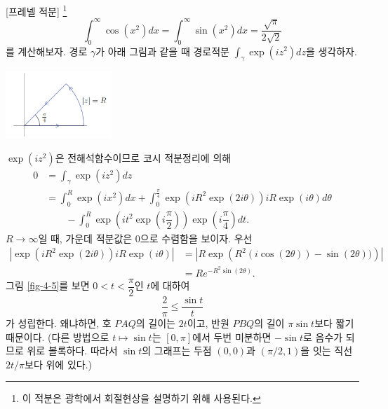 \begin{saltexample}{[프레넬 적분]}{} \footnote{
이 적분은 광학에서 회절현상을 설명하기 위해 사용된다.
}
\label{example-4-20}
\[
\int_0^\infty \cos(x^2) dx =  \int_0^\infty \sin(x^2) dx 
= \dfrac{\sqrt{\pi}}{2\sqrt{2}}
\]
를 계산해보자.
경로 $\gamma$가 아래 그림과 같을 때
경로적분 $\int_\gamma \exp(iz^2) dz$을 생각하자.

\begin{center}
\includegraphics[width=0.3\textwidth]{./SaltChapter/fig-4-0-13}
\end{center}

$\exp(iz^2)$은 전해석함수이므로
코시 적분정리에 의해
\begin{align*}
0 &= \int_\gamma \exp(iz^2) dz \\
& = \int_0^R \exp(ix^2)dx 
+ \int_0^{\frac\pi4} \exp(iR^2\exp(2i\theta))iR\exp(i\theta)d\theta \\
&\quad\quad 
- \int_0^R \exp\left( it^2\exp\left(i\dfrac\pi2\right)\right) 
\exp\left( i\dfrac\pi4\right)dt.
\end{align*}
$R\to\infty$일 때, 가운데 적분값은 $0$으로 수렴함을 보이자.
우선 
\begin{align*}
\left|  \exp(iR^2\exp(2i\theta))iR\exp(i\theta)  \right|
&= \left| R\exp\left(R^2(i\cos(2\theta)) - \sin(2\theta))\right) \right| \\
&= Re^{-R^2\sin(2\theta)}.
\end{align*}
그림 \ref{fig-4-5}를 보면 $0<t<\dfrac\pi2$인 $t$에 대하여
\[
\dfrac2\pi \le \dfrac{\sin t}t
\]
가 성립한다. 왜냐하면, 호 $PAQ$의 길이는 $2t$이고,
반원 $PBQ$의 길이 $\pi\sin t$보다 짧기 때문이다.
(다른 방법으로 $t\mapsto \sin t$는 $[0,\pi]$에서 
두번 미분하면 $-\sin t$로 음수가 되므로 위로 볼록하다.
따라서 $\sin t$의 그래프는 두점 $(0,0)$과 $(\pi/2,1)$을 잇는 직선 $2t/\pi$보다 위에 있다.)



\end{saltexample}
